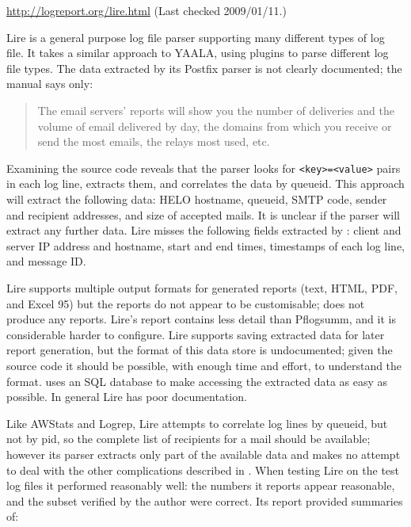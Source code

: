 \noindent{}\url{http://logreport.org/lire.html} \newline{}
(Last checked 2009/01/11.)

Lire is a general purpose log file parser supporting many different types
of log file.  It takes a similar approach to YAALA, using plugins to parse
different log file types.  The data extracted by its Postfix parser is not
clearly documented; the manual says only:

\begin{quotation}

    The email servers' reports will show you the number of deliveries and
    the volume of email delivered by day, the domains from which you
    receive or send the most emails, the relays most used, etc.

\end{quotation}

\noindent{}Examining the source code reveals that the parser looks for
\texttt{<key>=<value>} pairs in each log line, extracts them, and
correlates the data by queueid.  This approach will extract the following
data: HELO hostname, queueid, \gls{SMTP} code, sender and recipient
addresses, and size of accepted mails.  It is unclear if the parser will
extract any further data.  Lire misses the following fields extracted by
\parsername{}: client and server \gls{IP} address and hostname, start and
end times, timestamps of each log line, and message ID\@. 

Lire supports multiple output formats for generated reports (text, HTML,
PDF, and Excel 95) but the reports do not appear to be customisable;
\parsername{} does not produce any reports.  Lire's report contains less
detail than Pflogsumm, and it is considerable harder to configure.  Lire
supports saving extracted data for later report generation, but the format
of this data store is undocumented; given the source code it should be
possible, with enough time and effort, to understand the format.
\parsername{} uses an \gls{SQL} database to make accessing the extracted
data as easy as possible.  In general Lire has poor documentation.

Like AWStats and Logrep, Lire attempts to correlate log lines by queueid,
but not by \gls{pid}, so the complete list of recipients for a mail should
be available; however its parser extracts only part of the available data
and makes no attempt to deal with the other complications described in
.  When testing Lire on the \numberOFlogFILES{}
test log files it performed reasonably well: the numbers it reports appear
reasonable, and the subset verified by the author were correct.  Its report
provided summaries of: 

